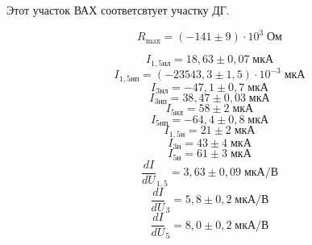 Этот участок ВАХ соответсвтует участку ДГ.

\[
    R_{\text{max}} = \left(-141 \pm 9\right)\cdot 10^{3}\;\text{Ом}
\]

\begin{figure}[ht!]
\end{figure}

\[
    I_{1{,}5\text{нл}} = 18{,}63 \pm 0{,}07\;\text{мкА} 
\]
\[
    I_{1{,}5\text{нп}} = \left(-23543{,}3 \pm 1{,}5\right)\cdot 10^{-3}\;\text{мкА}
\]
\[
    I_{3\text{нл}} = -47{,}1 \pm 0{,}7\;\text{мкА}
\]
\[
    I_{3\text{нп}} = 38{,}47 \pm 0{,}03\;\text{мкА}
\]
\[
    I_{5\text{нл}} = 58 \pm 2\;\text{мкА}
\]
\[
    I_{5\text{нп}} = -64{,}4 \pm 0{,}8\;\text{мкА}
\]
\[
    I_{1{,}5\text{н}} = 21 \pm 2\;\text{мкА}
\]
\[
    I_{3\text{н}} = 43 \pm 4\;\text{мкА}
\]
\[
    I_{5\text{н}} = 61 \pm 3\;\text{мкА}
\]
\[
    \frac{dI}{dU}_{1{,}5} = 3{,}63 \pm 0{,}09\;\text{мкА} / \text{В}
\]
\[
    \frac{dI}{dU}_{3} = 5{,}8 \pm 0{,}2\;\text{мкА} / \text{В}
\]
\[
    \frac{dI}{dU}_{5} = 8{,}0 \pm 0{,}2\;\text{мкА} / \text{В}
\]

